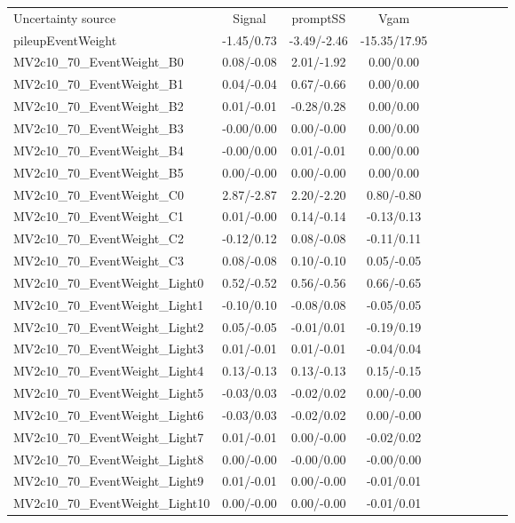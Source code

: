 \begin{table}[h]
\scriptsize
\begin{center}
\begin{tabular}{l|ccccccccc}
\hline
\hline
Uncertainty source &Signal &promptSS &Vgam \\
pileupEventWeight &-1.45/0.73 &-3.49/-2.46 &-15.35/17.95 \\
MV2c10\_70\_EventWeight\_B0 &0.08/-0.08 &2.01/-1.92 &0.00/0.00 \\
MV2c10\_70\_EventWeight\_B1 &0.04/-0.04 &0.67/-0.66 &0.00/0.00 \\
MV2c10\_70\_EventWeight\_B2 &0.01/-0.01 &-0.28/0.28 &0.00/0.00 \\
MV2c10\_70\_EventWeight\_B3 &-0.00/0.00 &0.00/-0.00 &0.00/0.00 \\
MV2c10\_70\_EventWeight\_B4 &-0.00/0.00 &0.01/-0.01 &0.00/0.00 \\
MV2c10\_70\_EventWeight\_B5 &0.00/-0.00 &0.00/-0.00 &0.00/0.00 \\
MV2c10\_70\_EventWeight\_C0 &2.87/-2.87 &2.20/-2.20 &0.80/-0.80 \\
MV2c10\_70\_EventWeight\_C1 &0.01/-0.00 &0.14/-0.14 &-0.13/0.13 \\
MV2c10\_70\_EventWeight\_C2 &-0.12/0.12 &0.08/-0.08 &-0.11/0.11 \\
MV2c10\_70\_EventWeight\_C3 &0.08/-0.08 &0.10/-0.10 &0.05/-0.05 \\
MV2c10\_70\_EventWeight\_Light0 &0.52/-0.52 &0.56/-0.56 &0.66/-0.65 \\
MV2c10\_70\_EventWeight\_Light1 &-0.10/0.10 &-0.08/0.08 &-0.05/0.05 \\
MV2c10\_70\_EventWeight\_Light2 &0.05/-0.05 &-0.01/0.01 &-0.19/0.19 \\
MV2c10\_70\_EventWeight\_Light3 &0.01/-0.01 &0.01/-0.01 &-0.04/0.04 \\
MV2c10\_70\_EventWeight\_Light4 &0.13/-0.13 &0.13/-0.13 &0.15/-0.15 \\
MV2c10\_70\_EventWeight\_Light5 &-0.03/0.03 &-0.02/0.02 &0.00/-0.00 \\
MV2c10\_70\_EventWeight\_Light6 &-0.03/0.03 &-0.02/0.02 &0.00/-0.00 \\
MV2c10\_70\_EventWeight\_Light7 &0.01/-0.01 &0.00/-0.00 &-0.02/0.02 \\
MV2c10\_70\_EventWeight\_Light8 &0.00/-0.00 &-0.00/0.00 &-0.00/0.00 \\
MV2c10\_70\_EventWeight\_Light9 &0.01/-0.01 &0.00/-0.00 &-0.01/0.01 \\
MV2c10\_70\_EventWeight\_Light10 &0.00/-0.00 &0.00/-0.00 &-0.01/0.01 \\

\end{tabular}
\end{center}
\end{table}
